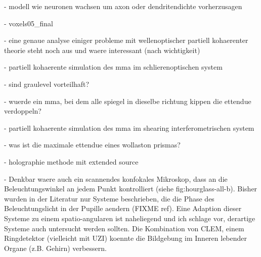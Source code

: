 \documentclass[oneside,a4paper,12pt,BCOR20mm,DIV14]{scrbook} %
\begin{document}
      - modell wie neuronen wachsen um axon oder dendritendichte
        vorherzusagen

  - voxels05\_final

- eine genaue analyse einiger probleme mit wellenoptischer partiell
  kohaerenter theorie steht noch aus und waere interessant (nach
  wichtigkeit)

  - partiell kohaerente simulation des mma im schlierenoptischen system

    - sind graulevel vorteilhaft?

    - wuerde ein mma, bei dem alle spiegel in dieselbe richtung kippen
      die ettendue verdoppeln?

  - partiell kohaerente simulation des mma im shearing
    interferometrischen system

    - was ist die maximale ettendue eines wollaston prismas?

  - holographie methode mit extended source

  - Denkbar waere auch ein scannendes konfokales Mikroskop, dass an
    die Beleuchtungswinkel an jedem Punkt kontrolliert (siehe
    fig:hourglass-all-b).  Bisher wurden in der Literatur nur Systeme
    beschrieben, die die Phase des Beleuchtungslicht in der Pupille
    aendern (FIXME ref). Eine Adaption dieser Systeme zu einem
    spatio-angularen ist naheliegend und ich schlage vor, derartige
    Systeme auch untersucht werden sollten. Die Kombination von CLEM,
    einem Ringdetektor (vielleicht mit UZI) koennte die Bildgebung im
    Inneren lebender Organe (z.B. Gehirn) verbessern.

\appendix



%
\end{document}
